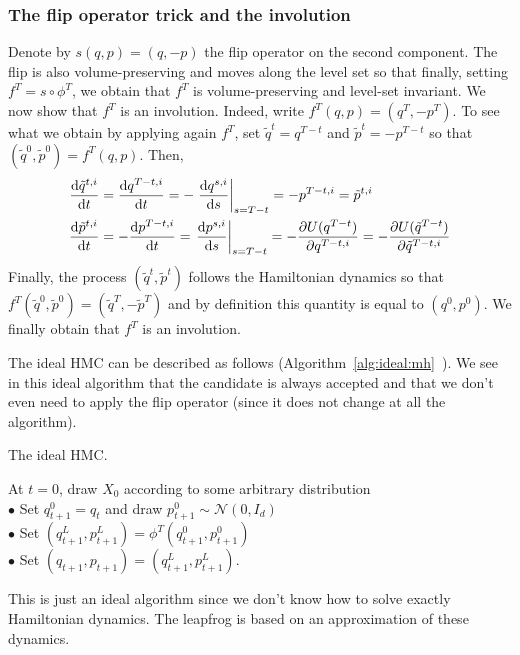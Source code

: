 \documentclass[english,graybox,envcountchap,envcountsame,sectrefs,shortlabels]{svmono}
\theoremstyle{style}
\newcommand{\gauss}{\mathcal{N}}
\begin{document}
\subsubsection{The flip operator trick and the involution}
Denote by $s(q,p)=(q,-p)$ the flip operator on the second component. The flip is also volume-preserving and moves along the level set so that finally, setting $f^T=s \circ \phi^T$, we obtain that $f^T$ is volume-preserving and level-set invariant. We now show that $f^T$ is an involution. Indeed, write $f^T(q,p)=(q^T,-p^T)$. To see what we obtain by applying again $f^T$, set $\tilde q^t=q^{T-t}$ and $\tilde p^t=-p^{T-t}$ so that $(\tilde q^0,\tilde p^0)=f^T(q,p)$. Then,
\begin{align*}
\frac{\mathrm{d} \tilde q^{t,i}}{\mathrm{d} t}&=\frac{\mathrm{d} q^{T-t,i}}{\mathrm{d} t}=-\left. \frac{\mathrm{d} q^{s,i}}{\mathrm{d} s} \right|_{s=T-t}=-p^{T-t,i}=\tilde p^{t,i}\\
\frac{\mathrm{d} \tilde p^{t,i}}{\mathrm{d} t}&=-\frac{\mathrm{d} p^{T-t,i}}{\mathrm{d} t}= \left. \frac{\mathrm{d} p^{s,i}}{\mathrm{d} s} \right|_{s=T-t}=-\frac{\partial U(q^{T-t})}{\partial q^{T-t,i}}=-\frac{\partial U(\tilde q^{T-t})}{\partial \tilde q^{T-t,i}}
\end{align*}
Finally, the process $(\tilde q^t,\tilde p^t)$ follows the Hamiltonian dynamics so that $f^T(\tilde q^0,\tilde p^0)=(\tilde q^T,-\tilde p^T)$ and by definition this quantity is equal to $(q^0,p^0)$. We finally obtain that $f^T$ is an involution.

The ideal HMC can be described as follows (Algorithm~\ref{alg:ideal:mh}~). We see in this ideal algorithm that the candidate is always accepted and that we don't even need to apply the flip operator (since it does not change at all the algorithm).
\begin{algorithm}
\caption{\label{alg:ideal:mh} The ideal HMC.}
{}
\BlankLine
At $t=0$, draw $X_{0}$ according to some arbitrary distribution\\
{
$\bullet$ Set $q_{t+1}^0=q_{t}$ and draw $p_{t+1}^0\sim \gauss(0,I_d)$ \\
$\bullet$ Set  $(q_{t+1}^L,p_{t+1}^L)=\phi^T(q_{t+1}^0,p_{t+1}^0)$ \\
$\bullet$ Set $(q_{t+1},p_{t+1})=(q_{t+1}^L,p_{t+1}^L)$.
}
\end{algorithm}

This is just an ideal algorithm since we don't know how to solve exactly Hamiltonian dynamics. The leapfrog is based on an approximation of these dynamics.
\end{document}
